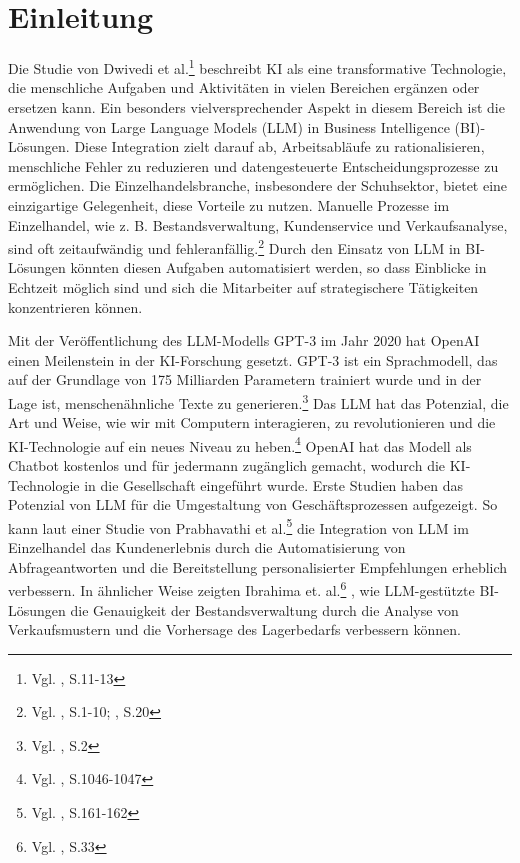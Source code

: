 

\section{Einleitung} 
\label{sec:einleitung}

Die Studie von Dwivedi et al.\footnote{Vgl. \cite{DwivediHughes2021}, S.11-13} beschreibt KI als eine transformative Technologie, die menschliche Aufgaben und Aktivitäten in vielen Bereichen ergänzen oder ersetzen kann. Ein besonders vielversprechender Aspekt in diesem Bereich ist die Anwendung von Large Language Models (LLM) in Business Intelligence (BI)-Lösungen. Diese Integration zielt darauf ab, Arbeitsabläufe zu rationalisieren, menschliche Fehler zu reduzieren und datengesteuerte Entscheidungsprozesse zu ermöglichen. 
Die Einzelhandelsbranche, insbesondere der Schuhsektor, bietet eine einzigartige Gelegenheit, diese Vorteile zu nutzen. Manuelle Prozesse im Einzelhandel, wie z. B. Bestandsverwaltung, Kundenservice und Verkaufsanalyse, sind oft zeitaufwändig und fehleranfällig.\footnote{Vgl. \cite{Perez2018}, S.1-10; \cite{Lee2018}, S.20} Durch den Einsatz von LLM in BI-Lösungen könnten diesen Aufgaben automatisiert werden, so dass Einblicke in Echtzeit möglich sind und sich die Mitarbeiter auf strategischere Tätigkeiten konzentrieren können.


Mit der Veröffentlichung des LLM-Modells GPT-3 im Jahr 2020 hat OpenAI einen Meilenstein in der KI-Forschung gesetzt. GPT-3 ist ein Sprachmodell, das auf der Grundlage von 175 Milliarden Parametern trainiert wurde und in der Lage ist, menschenähnliche Texte zu generieren.\footnote{Vgl. \cite{Brown2020}, S.2} Das LLM hat das Potenzial, die Art und Weise, wie wir mit Computern interagieren, zu revolutionieren und die KI-Technologie auf ein neues Niveau zu heben.\footnote{Vgl. \cite{Lu2021}, S.1046-1047} OpenAI hat das Modell als Chatbot kostenlos und für jedermann zugänglich gemacht, wodurch die KI-Technologie in die Gesellschaft eingeführt wurde. Erste Studien haben das Potenzial von LLM für die Umgestaltung von Geschäftsprozessen aufgezeigt. So kann laut einer Studie von Prabhavathi et al.\footnote{Vgl. \cite{Prabhavathi2019}, S.161-162} die Integration von LLM im Einzelhandel das Kundenerlebnis durch die Automatisierung von Abfrageantworten und die Bereitstellung personalisierter Empfehlungen erheblich verbessern. In ähnlicher Weise zeigten Ibrahima et. al.\footnote{Vgl. \cite{Ibrahima2021}, S.33} , wie LLM-gestützte BI-Lösungen die Genauigkeit der Bestandsverwaltung durch die Analyse von Verkaufsmustern und die Vorhersage des Lagerbedarfs verbessern können.

